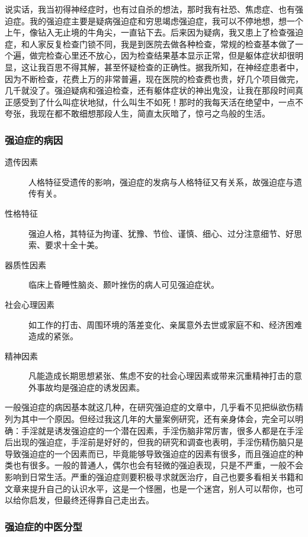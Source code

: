 说实话，我当初得神经症时，也有过自杀的想法，那时我有社恐、焦虑症、也有强迫症。我的强迫症主要是疑病强迫症和穷思竭虑强迫症，我可以不停地想，想一个上午，像钻入无止境的牛角尖，一直钻下去。后来因为疑病，我又患上了检查强迫症，和人家反复检查门锁不同，我是到医院去做各种检查，常规的检查基本做了一个遍，做完检查心里还不放心，因为检查结果基本显示正常，但是躯体症状却很明显，这让我百思不得其解，甚至怀疑检查的正确性。据我所知，在神经症患者中，因为不断检查，花费上万的非常普遍，现在医院的检查费也贵，好几个项目做完，几千就没了。强迫疑病和强迫检查，还有躯体症状的神出鬼没，让我在那段时间真正感受到了什么叫症状地狱，什么叫生不如死！那时的我每天活在绝望中，一点不夸张，我现在都不敢细想那段人生，简直太灰暗了，惊弓之鸟般的生活。

\subsubsection{强迫症的病因}

\begin{description}
    \item[遗传因素] 人格特征受遗传的影响，强迫症的发病与人格特征又有关系，故强迫症与遗传有关。
    \item[性格特征] 强迫人格，其特征为拘谨、犹豫、节俭、谨慎、细心、过分注意细节、好思索、要求十全十美。
    \item[器质性因素] 临床上昏睡性脑炎、颞叶挫伤的病人可见强迫症状。
    \item[社会心理因素] 如工作的打击、周围环境的落差变化、亲属意外去世或家庭不和、经济困难造成的紧张。
    \item[精神因素] 凡能造成长期思想紧张、焦虑不安的社会心理因素或带来沉重精神打击的意外事故均是强迫症的诱发因素。
\end{description}

一般强迫症的病因基本就这几种，在研究强迫症的文章中，几乎看不见把纵欲伤精列为其中一个原因。但经过我这几年的大量案例研究，还有亲身体会，完全可以明确：手淫就是诱发强迫症的一个潜在因素，手淫伤脑非常厉害，很多人都是在手淫后出现的强迫症，手淫前是好好的，但我的研究和调查也表明，手淫伤精伤脑只是导致强迫症的一个因素而已，毕竟能够导致强迫症的因素有很多，而且强迫症的种类也有很多。一般的普通人，偶尔也会有轻微的强迫表现，只是不严重，一般不会影响到日常生活。严重的强迫症则要积极寻求就医治疗，自己也要多看相关书籍和文章来提升自己的认识水平，这是一个怪圈，也是一个迷宫，别人可以帮你，也可以给你启发，但最终还得靠自己走出去。

\subsubsection{强迫症的中医分型}

